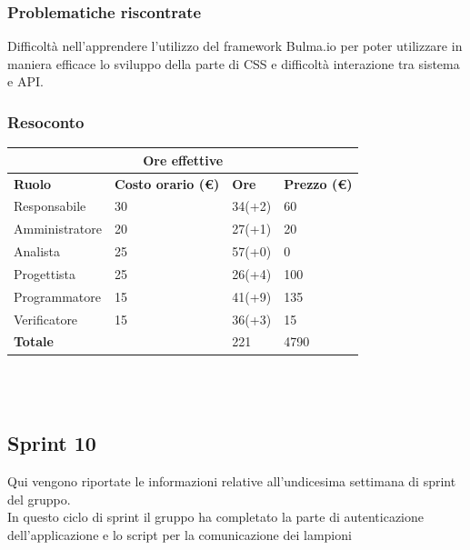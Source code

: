 \documentclass[9pt]{article}
\begin{document}
\subsubsection{Problematiche riscontrate}
Difficoltà nell’apprendere l’utilizzo del framework Bulma.io per poter utilizzare in maniera efficace lo sviluppo della parte di CSS e difficoltà interazione tra sistema e API.


\subsubsection{Resoconto}
\begin{center}
	\begin{tabularx}{\textwidth}{|X|X|X|X|}
		\hline
		\multicolumn{4}{|c|}{\textbf{Ore effettive}}                                      \\
		\hline
		\hline
		\textbf{Ruolo}  & \textbf{Costo orario (\euro)} & \textbf{Ore} & \textbf{Prezzo (\euro)} \\
		\hline
		Responsabile    & 30                            & 34(+2)       & 60                      \\
		\hline
		Amministratore  & 20                            & 27(+1)       & 20                      \\
		\hline
		Analista        & 25                            & 57(+0)       & 0                       \\
		\hline
		Progettista     & 25                            & 26(+4)       & 100                     \\
		\hline
		Programmatore   & 15                            & 41(+9)       & 135                     \\
		\hline
		Verificatore    & 15                            & 36(+3)       & 15                      \\
		\hline
		\hline
		\textbf{Totale} &                               & 221          & 4790                    \\
		\hline
	\end{tabularx}\\[8pt]
	\mbox{}\\
\end{center}

\subsection{Sprint 10}
Qui vengono riportate le informazioni relative all'undicesima settimana di sprint del gruppo. \\
In questo ciclo di sprint il gruppo ha completato la parte di autenticazione dell'applicazione e lo script per la comunicazione dei lampioni \\
\end{document}
